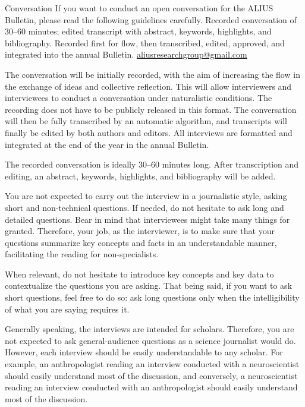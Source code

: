 \documentclass[11pt]{article}
\begin{document}
\guideHeader
  {Conversation}
  {If you want to conduct an open conversation for the ALIUS Bulletin, please read the following guidelines carefully.}
  {Recorded conversation of 30--60 minutes; edited transcript with abstract, keywords, highlights, and bibliography.}
  {Recorded first for flow, then transcribed, edited, approved, and integrated into the annual Bulletin.}
  {\href{mailto:aliusresearchgroup@gmail.com}{aliusresearchgroup@gmail.com}}


The conversation will be initially recorded, with the aim of increasing the flow in the exchange of ideas and collective reflection. This will allow interviewers and interviewees to conduct a conversation under naturalistic conditions. The recording does not have to be publicly released in this format. The conversation will then be fully transcribed by an automatic algorithm, and transcripts will finally be edited by both authors and editors. All interviews are formatted and integrated at the end of the year in the annual Bulletin.


The recorded conversation is ideally 30--60 minutes long. After transcription and editing, an abstract, keywords, highlights, and bibliography will be added.


You are not expected to carry out the interview in a journalistic style, asking short and non-technical questions. If needed, do not hesitate to ask long and detailed questions. Bear in mind that interviewees might take many things for granted. Therefore, your job, as the interviewer, is to make sure that your questions summarize key concepts and facts in an understandable manner, facilitating the reading for non-specialists.

When relevant, do not hesitate to introduce key concepts and key data to contextualize the questions you are asking. That being said, if you want to ask short questions, feel free to do so: ask long questions only when the intelligibility of what you are saying requires it.

Generally speaking, the interviews are intended for scholars. Therefore, you are not expected to ask general-audience questions as a science journalist would do. However, each interview should be easily understandable to any scholar. For example, an anthropologist reading an interview conducted with a neuroscientist should easily understand most of the discussion, and conversely, a neuroscientist reading an interview conducted with an anthropologist should easily understand most of the discussion.
\end{document}
